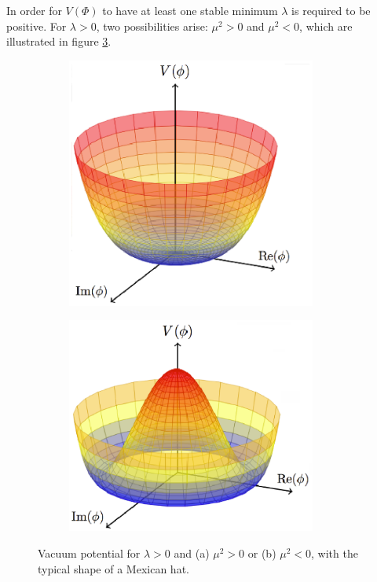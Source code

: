 In order for $V(\Phi)$ to have at least one stable minimum $\lambda$ is required to be positive. For $\lambda>0$, two possibilities arise: $\mu^{2}>0$ and $\mu^{2}<0$, which are illustrated in figure \ref{fig:theo:higgspotential}. 
\begin{figure}[h!]
\begin{subfigure}{0.5\textwidth}
  \centering
  \includegraphics[width=0.9\textwidth]{figures/Theory/higgs1.eps}
  \caption{}
  \label{fig:theo:higgs1}
\end{subfigure}
\begin{subfigure}{0.5\textwidth}
  \centering
  \includegraphics[width=0.9\textwidth]{figures/Theory/higgs2.eps}
  \caption{}
  \label{fig:theo:higgs2}
\end{subfigure}

\captionsetup{width=0.85\textwidth} \caption{\small Vacuum potential for $\lambda>0$ and (a) $\mu^{2}>0$ or (b) $\mu^{2}<0$, with the typical shape of a Mexican hat.}
\label{fig:theo:higgspotential}
\end{figure}
